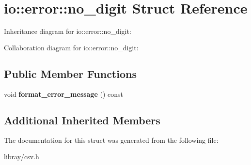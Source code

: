 \hypertarget{structio_1_1error_1_1no__digit}{}\section{io\+:\+:error\+:\+:no\+\_\+digit Struct Reference}
\label{structio_1_1error_1_1no__digit}


Inheritance diagram for io\+:\+:error\+:\+:no\+\_\+digit\+:


Collaboration diagram for io\+:\+:error\+:\+:no\+\_\+digit\+:
\subsection*{Public Member Functions}
\begin{DoxyCompactItemize}
\item 
\mbox{\label{structio_1_1error_1_1no__digit_a469275c63f67171903f9cdb2418da5b3}} 
void {\bfseries format\+\_\+error\+\_\+message} () const
\end{DoxyCompactItemize}
\subsection*{Additional Inherited Members}


The documentation for this struct was generated from the following file\+:\begin{DoxyCompactItemize}
\item 
libray/csv.\+h\end{DoxyCompactItemize}
